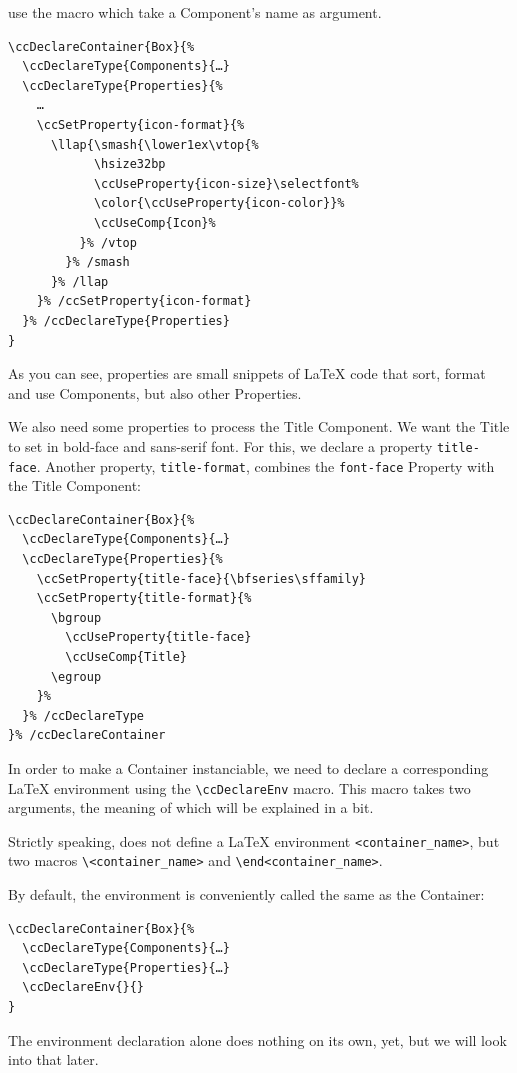 use the \UsageMacro{\ccUseComp} macro which take a Component's name as
argument.
\begin{lstlisting}
\ccDeclareContainer{Box}{%
  \ccDeclareType{Components}{…}
  \ccDeclareType{Properties}{%
    …
    \ccSetProperty{icon-format}{%
      \llap{\smash{\lower1ex\vtop{%
            \hsize32bp
            \ccUseProperty{icon-size}\selectfont%
            \color{\ccUseProperty{icon-color}}%
            \ccUseComp{Icon}%
          }% /vtop
        }% /smash
      }% /llap
    }% /ccSetProperty{icon-format}
  }% /ccDeclareType{Properties}
}
\end{lstlisting}
As you can see, properties are small snippets of {\LaTeX} code that
sort, format and use Components, but also other Properties.

We also need some properties to process the Title Component. We want
the Title to set in bold-face and sans-serif font. For this, we
declare a property \texttt{title-face}. Another property,
\texttt{title-format}, combines the \texttt{font-face} Property with
the Title Component:
\begin{lstlisting}
\ccDeclareContainer{Box}{%
  \ccDeclareType{Components}{…}
  \ccDeclareType{Properties}{%
    \ccSetProperty{title-face}{\bfseries\sffamily}
    \ccSetProperty{title-format}{%
      \bgroup
        \ccUseProperty{title-face}
        \ccUseComp{Title}
      \egroup
    }%
  }% /ccDeclareType
}% /ccDeclareContainer
\end{lstlisting}
In order to make a Container instanciable, we need to declare a
corresponding {\LaTeX} environment using the \lstinline{\ccDeclareEnv}
macro. This macro takes two arguments, the meaning of which will be
explained in a bit.

\begin{Background}
  Strictly speaking, \texttt{\string\ccDeclareEnv} does not
  define a {\LaTeX} environment \texttt{<container\_name>}, but two
  macros \protect\texttt{\textbackslash<container\_name>} and
  \texttt{\textbackslash end<container\_name>}.
\end{Background}

By default, the environment is conveniently called the same as the
Container:
\begin{lstlisting}
\ccDeclareContainer{Box}{%
  \ccDeclareType{Components}{…}
  \ccDeclareType{Properties}{…}
  \ccDeclareEnv{}{}
}
\end{lstlisting}
The environment declaration alone does nothing on its own, yet, but we
will look into that later.

